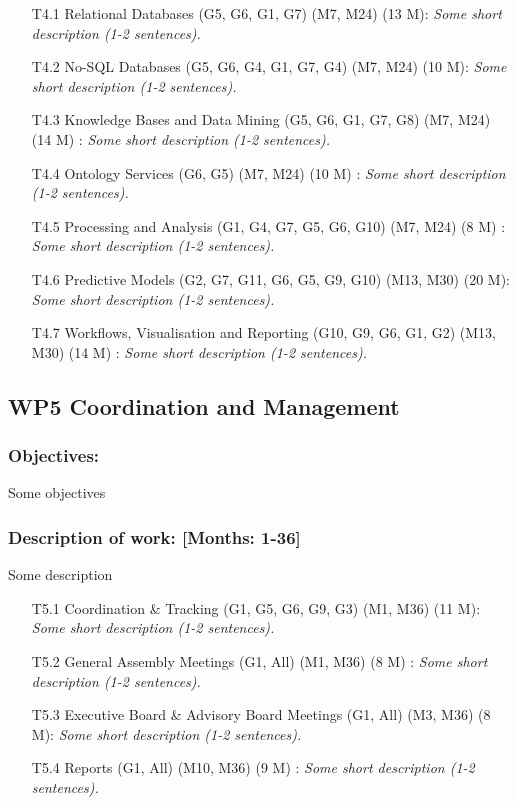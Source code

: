 \documentclass{report}
\begin{document}
\begin{enumerate}
\item [T4.1] Relational Databases (G5, G6, G1, G7) (M7, M24) (13 M): \emph{ Some short description (1-2 sentences).}
\item [T4.2] No-SQL Databases (G5, G6, G4, G1, G7, G4) (M7, M24) (10 M): \emph{ Some short description (1-2 sentences).}
\item [T4.3] Knowledge Bases and Data Mining (G5, G6, G1, G7, G8) (M7, M24) (14 M) : \emph{ Some short description (1-2 sentences).}
\item [T4.4] Ontology Services (G6, G5) (M7, M24) (10 M) : \emph{ Some short description (1-2 sentences).}
\item [T4.5] Processing and Analysis (G1, G4, G7, G5, G6, G10) (M7, M24) (8 M) : \emph{ Some short description (1-2 sentences).}
\item [T4.6] Predictive Models (G2, G7, G11, G6, G5, G9, G10) (M13, M30) (20 M): \emph{ Some short description (1-2 sentences).}
\item [T4.7] Workflows, Visualisation and Reporting (G10, G9, G6, G1, G2) (M13, M30) (14 M) : \emph{ Some short description (1-2 sentences).}
\end{enumerate}

\subsection*{WP5 Coordination and Management}

\subsubsection{Objectives:} Some objectives
\subsubsection{Description of work: [Months: 1-36]} Some description

\begin{enumerate}
\item [T5.1] Coordination \& Tracking (G1, G5, G6, G9, G3) (M1, M36) (11 M): \emph{ Some short description (1-2 sentences).}
\item [T5.2] General Assembly Meetings (G1, All) (M1, M36) (8 M) : \emph{ Some short description (1-2 sentences).}
\item [T5.3] Executive Board \& Advisory Board Meetings (G1, All) (M3, M36) (8 M): \emph{ Some short description (1-2 sentences).}
\item [T5.4] Reports (G1, All) (M10, M36) (9 M) : \emph{ Some short description (1-2 sentences).}
\end{enumerate}
\end{document}
